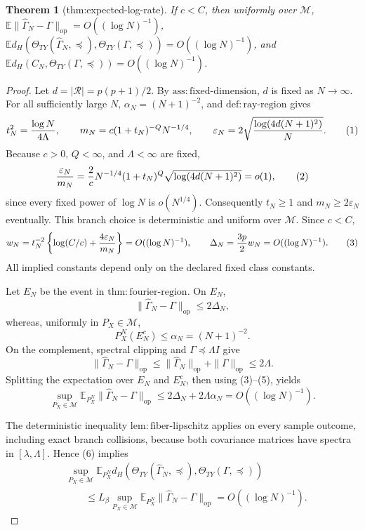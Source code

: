 \documentclass{article}
\newtheorem{theorem}{Theorem}
\begin{document}
\begin{theorem}[thm:expected-log-rate]\label{thm:expected-log-rate}
If \(c<C\), then uniformly over \(\mathcal M\), \(\mathbb E\|\widehat\Gamma_N-\Gamma\|_{\mathrm{op}}=O((\log N)^{-1})\), \(\mathbb E d_H(\Theta_{TY}(\widehat\Gamma_N,\preceq),\Theta_{TY}(\Gamma,\preceq))=O((\log N)^{-1})\), and \(\mathbb E d_H(C_N,\Theta_{TY}(\Gamma,\preceq))=O((\log N)^{-1})\).
\end{theorem}
\begin{proof}
Let \(d=|\mathcal R|=p(p+1)/2\).  By \(\mathrm{ass:fixed\text{-}dimension}\), \(d\) is fixed as \(N\to\infty\).  For all sufficiently large \(N\), \(\alpha_N=(N+1)^{-2}\), and \(\mathrm{def:ray\text{-}region}\) gives
\[
 t_N^2={\log N\over4\Lambda},\qquad
 m_N=c(1+t_N)^{-Q}N^{-1/4},\qquad
 \varepsilon_N=2\sqrt{{\log(4d(N+1)^2)\over N}}. \tag{1}
\]
Because \(c>0\), \(Q<\infty\), and \(\Lambda<\infty\) are fixed,
\[
 {\varepsilon_N\over m_N}
 ={2\over c}N^{-1/4}(1+t_N)^Q
 \sqrt{\log(4d(N+1)^2)}=o(1), \tag{2}
\]
since every fixed power of \(\log N\) is \(o(N^{1/4})\).  Consequently \(t_N\ge1\) and \(m_N\ge2\varepsilon_N\) eventually.  This branch choice is deterministic and uniform over \(\mathcal M\).  Since \(c<C\),
\[
 w_N=t_N^{-2}\left\{\log(C/c)+{4\varepsilon_N\over m_N}\right\}
 =O((\log N)^{-1}),
 \qquad
 \Delta_N={3p\over2}w_N=O((\log N)^{-1}). \tag{3}
\]
All implied constants depend only on the declared fixed class constants.

Let \(E_N\) be the event in \(\mathrm{thm:fourier\text{-}region}\).  On \(E_N\),
\[
 \|\widehat\Gamma_N-\Gamma\|_{\mathrm{op}}\le2\Delta_N,
\]
whereas, uniformly in \(P_X\in\mathcal M\),
\[
 P_X^N(E_N^c)\le\alpha_N=(N+1)^{-2}. \tag{4}
\]
On the complement, spectral clipping and \(\Gamma\preceq\Lambda I\) give
\[
 \|\widehat\Gamma_N-\Gamma\|_{\mathrm{op}}
 \le\|\widehat\Gamma_N\|_{\mathrm{op}}+\|\Gamma\|_{\mathrm{op}}
 \le2\Lambda. \tag{5}
\]
Splitting the expectation over \(E_N\) and \(E_N^c\), then using (3)--(5), yields
\[
 \sup_{P_X\in\mathcal M}
 \mathbb E_{P_X^N}\|\widehat\Gamma_N-\Gamma\|_{\mathrm{op}}
 \le2\Delta_N+2\Lambda\alpha_N
 =O((\log N)^{-1}). \tag{6}
\]

The deterministic inequality \(\mathrm{lem:fiber\text{-}lipschitz}\) applies on every sample outcome, including exact branch collisions, because both covariance matrices have spectra in \([\lambda,\Lambda]\).  Hence (6) implies
\[
 \begin{aligned}
 &\sup_{P_X\in\mathcal M}\mathbb E_{P_X^N}
 d_H\!\left(\Theta_{TY}(\widehat\Gamma_N,\preceq),
              \Theta_{TY}(\Gamma,\preceq)\right)\\
 &\qquad\le L_\beta\sup_{P_X\in\mathcal M}
 \mathbb E_{P_X^N}\|\widehat\Gamma_N-\Gamma\|_{\mathrm{op}}
 =O((\log N)^{-1}).
 \end{aligned} \tag{7}
\]


\end{proof}
\end{document}
